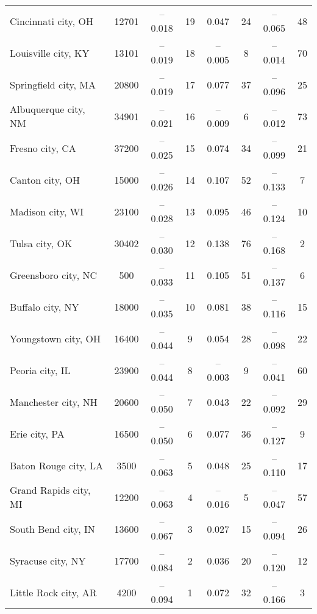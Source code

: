\documentclass{article}
\begin{document}
\begin{table}[tbp]
\begin{tabularx}{\linewidth}{lCCCCCCC}
Cincinnati city, OH&12701&--0.018&19&0.047&24&--0.065&48 \tabularnewline
Louisville city, KY&13101&--0.019&18&--0.005&8&--0.014&70 \tabularnewline
Springfield city, MA&20800&--0.019&17&0.077&37&--0.096&25 \tabularnewline
Albuquerque city, NM&34901&--0.021&16&--0.009&6&--0.012&73 \tabularnewline
Fresno city, CA&37200&--0.025&15&0.074&34&--0.099&21 \tabularnewline
Canton city, OH&15000&--0.026&14&0.107&52&--0.133&7 \tabularnewline
Madison city, WI&23100&--0.028&13&0.095&46&--0.124&10 \tabularnewline
Tulsa city, OK&30402&--0.030&12&0.138&76&--0.168&2 \tabularnewline
Greensboro city, NC&500&--0.033&11&0.105&51&--0.137&6 \tabularnewline
Buffalo city, NY&18000&--0.035&10&0.081&38&--0.116&15 \tabularnewline
Youngstown city, OH&16400&--0.044&9&0.054&28&--0.098&22 \tabularnewline
Peoria city, IL&23900&--0.044&8&--0.003&9&--0.041&60 \tabularnewline
Manchester city, NH&20600&--0.050&7&0.043&22&--0.092&29 \tabularnewline
Erie city, PA&16500&--0.050&6&0.077&36&--0.127&9 \tabularnewline
Baton Rouge city, LA&3500&--0.063&5&0.048&25&--0.110&17 \tabularnewline
Grand Rapids city, MI&12200&--0.063&4&--0.016&5&--0.047&57 \tabularnewline
South Bend city, IN&13600&--0.067&3&0.027&15&--0.094&26 \tabularnewline
Syracuse city, NY&17700&--0.084&2&0.036&20&--0.120&12 \tabularnewline
Little Rock city, AR&4200&--0.094&1&0.072&32&--0.166&3 \tabularnewline
\bottomrule 

\end{tabularx}
\end{table}
\end{document}
